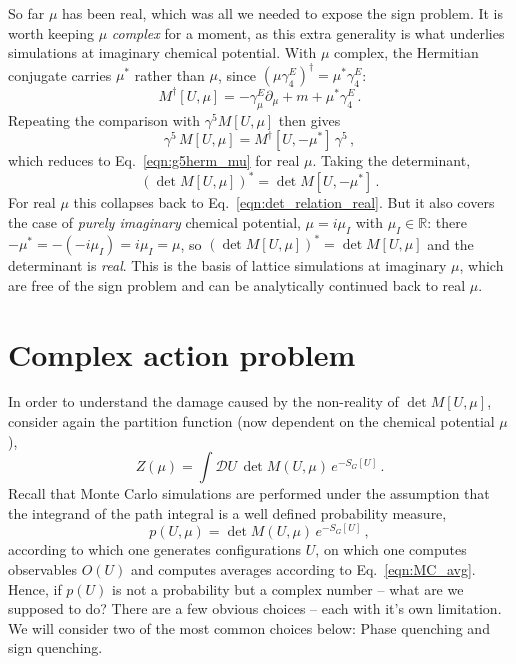 \documentclass[11pt]{article}
\theoremstyle{definition}
\begin{document}
\medskip
So far $\mu$ has been real, which was all we needed to expose the sign problem. It is worth keeping $\mu$ \emph{complex} for a moment, as this extra generality is what underlies simulations at imaginary chemical potential. With $\mu$ complex, the Hermitian conjugate carries $\mu^*$ rather than $\mu$, since $(\mu\gamma^E_4)^\dagger = \mu^*\gamma^E_4$:
\begin{equation}
    M^\dagger[U, \mu] = -\gamma^E_\mu \partial_\mu + m + \mu^*\gamma^E_4 \,.
\end{equation}
Repeating the comparison with $\gamma^5 M[U,\mu]$ then gives
\begin{equation}\label{eqn:g5herm_complex}
\gamma^5 \, M[U, \mu] = M^\dagger[U, -\mu^*] \, \gamma^5 \,,
\end{equation}
which reduces to Eq.~\eqref{eqn:g5herm_mu} for real $\mu$. Taking the determinant,
\begin{equation}\label{eqn:det_relation_complex}
    \left(\det M[U,\mu]\right)^* = \det M[U, -\mu^*] \,.
\end{equation}
For real $\mu$ this collapses back to Eq.~\eqref{eqn:det_relation_real}. But it also covers the case of \emph{purely imaginary} chemical potential, $\mu = i\mu_I$ with $\mu_I \in \mathbb{R}$: there $-\mu^* = -(-i\mu_I) = i\mu_I = \mu$, so $(\det M[U,\mu])^* = \det M[U,\mu]$ and the determinant is \emph{real}. This is the basis of lattice simulations at imaginary $\mu$, which are free of the sign problem and can be analytically continued back to real $\mu$.

\section{Complex action problem}
In order to understand the damage caused by the non-reality of $\det M[U,\mu]$, consider again the partition function (now dependent on the chemical potential $\mu$),
\begin{equation}\label{eqn:Z_latt_mu}
    Z(\mu) = \int \mathcal{D}U \, \det M(U,\mu) \, e^{-S_G[U]} \,.
\end{equation}
Recall that Monte Carlo simulations are performed under the assumption that the integrand of the path integral is a well defined probability measure,
\begin{equation}
    p(U,\mu) = \det M(U,\mu) \, e^{-S_G[U]} \,,
\end{equation}
according to which one generates configurations $U$, on which one computes observables $O(U)$ and computes averages according to Eq.~\ref{eqn:MC_avg}. Hence, if $p(U)$ is not a probability but a complex number -- what are we supposed to do? There are a few obvious choices -- each with it's own limitation. We will consider two of the most common choices below: Phase quenching and sign quenching. \\
\end{document}
